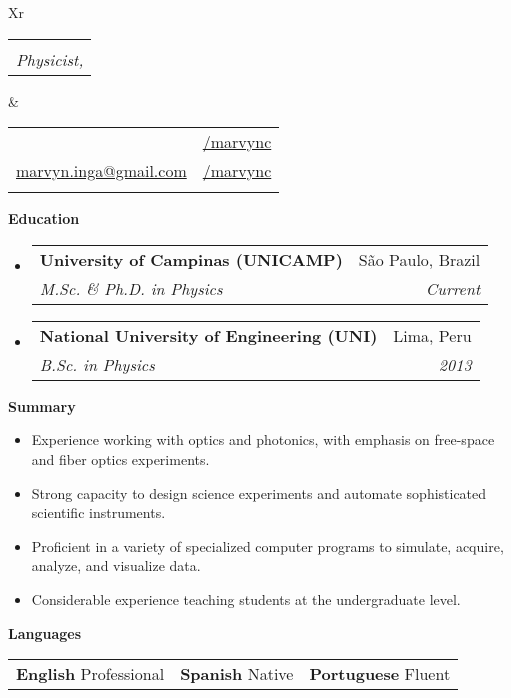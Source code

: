\documentclass[letterpaper, 12pt]{article}[leftmargin=*]
\makeatletter
\def \fullname {Marvyn Inga}
\def \subtitle {Physicist, \faMale}
\def \linkedinicon {\faLinkedin}
\def \linkedinlink {https://www.linkedin.com/in/marvync/}
\def \linkedintext {/marvync}
\def \phoneicon {\faPhone}
\def \phonetext {+55-19-983638657}
\def \emailicon {\faEnvelope}
\def \emaillink {mailto:marvyn.inga@gmail.com}
\def \emailtext {marvyn.inga@gmail.com}
\def \githubicon {\faGithub}
\def \githublink {https://github.com/marvync}
\def \githubtext {/marvync}
\def \headertype {\doublecol} %
\def \linkedin {\linkedinicon \hspace{3pt}\href{\linkedinlink}{\linkedintext}}
\def \phone {\phoneicon \hspace{3pt}{ \phonetext}}
\def \email {\emailicon \hspace{3pt}\href{\emaillink}{\emailtext}}
\def \github {\githubicon \hspace{3pt}\href{\githublink}{\githubtext}}
\renewcommand{\section}[2]{
  \colorbox{secondary}{\color{white}\raggedbottom\normalsize\textbf{{#1}{\hspace{7pt}#2}}}
}
\newcommand{\resumeEntryStart}{\begin{itemize}[leftmargin=2.5mm]\itemsep8pt}
\newcommand{\resumeEntryEnd}{\end{itemize}}
\newcommand{\resumeItemListStart}{\begin{itemize}[leftmargin=4.5mm]\itemsep-3pt}
\newcommand{\resumeItemListEnd}{\end{itemize}}
\newcommand{\resumeItem}[1]{
  \item\small{
    {#1}
  }
}
\newcommand{\resumeEntryTSDL}[4]{
  \item[]
    \begin{tabularx}{0.97\textwidth}{X@{\hspace{60pt}}r}
      \textbf{\color{primary}#1} & {\firabook\color{accent}\small#2} \\
      \vspace{-0.3cm}
      \textit{\color{accent}\small#3} & \textit{\color{accent}\small#4} \\
    \end{tabularx}\vspace{-0.1cm}
}
\newcommand{\resumeEntryS}[2]{
  \item[]\small{
    \textbf{\color{primary}#1 }{ #2 }
  }
}
\newcommand{\triplecol}[3]{
	\vspace{-0.3cm}
	\begin{tabularx}{\textwidth}{XXX}
	{\small#1} & {\small#2} & {\small#3}
	\end{tabularx}
}
\newcommand{\doublecol}[6]{
  \begin{tabularx}{\textwidth}{Xr}
    {
      \begin{tabular}[c]{l}
        \fontsize{35}{45}\selectfont{\color{primary}{{\textbf{\fullname}}}} \\
        {\textit{\subtitle}} %
      \end{tabular}
    } & {
      \begin{tabular}[c]{l@{\hspace{1.5em}}l}
        {\small#4} & {\small#1} \\
        {\small#5} & {\small#2} \\
        {\small#6} & {\small#3}
      \end{tabular}
    }
  \end{tabularx}
\vspace{0.3cm}
}
\newcommand{\singlecol}[6]{
  \begin{tabularx}{\textwidth}{Xr}
    {
      \begin{tabular}[b]{l}
        \fontsize{35}{45}\selectfont{\color{primary}{{\textbf{\fullname}}}} \\
        {\textit{\subtitle}} %
      \end{tabular}
    } & {
      \begin{tabular}[c]{l}
        {\small#1} \\
        {\small#2} \\
        {\small#3} \\
        {\small#4} \\
        {\small#5} \\
        {\small#6}
      \end{tabular}
    }
  \end{tabularx}
}
\makeatother
\begin{document}


\headertype{\linkedin}{\github}{}{\phone}{\email}{} %

\section{\faGraduationCap}{Education}

\resumeEntryStart
	\small
	\resumeEntryTSDL
    {University of Campinas (UNICAMP)}{São Paulo, Brazil}
	{M.Sc. \& Ph.D. in Physics}{Current}

	\resumeEntryTSDL
	{National University of Engineering (UNI)}{Lima, Peru}
	{B.Sc. in Physics}{2013}
\resumeEntryEnd


\section{\faFolderOpen}{Summary}
\resumeItemListStart
\resumeItem {Experience working with optics and photonics, with emphasis on free-space and fiber optics experiments.}
\resumeItem {Strong capacity to design science experiments and automate sophisticated scientific instruments.}
\resumeItem {Proficient in a variety of specialized computer programs to simulate, acquire, analyze, and visualize data.}
\resumeItem {Considerable experience teaching students at the undergraduate level.}
\resumeItemListEnd

\section{\faComment}{Languages}
\resumeEntryStart
	\small
	\triplecol{\resumeEntryS{English} {Professional}}{\resumeEntryS{Spanish}{Native}}{\resumeEntryS{Portuguese}{Fluent}}
\resumeEntryEnd

\end{document}

